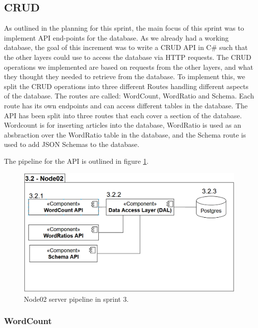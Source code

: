 \subsection{CRUD}

As outlined in the planning for this sprint, the main focus of this sprint was to implement API end-points for the database.
As we already had a working database, the goal of this increment was to write a CRUD API in C\# such that the other layers could use to access the database via HTTP requests.
The CRUD operations we implemented are based on requests from the other layers, and what they thought they needed to retrieve from the database.
To implement this, we split the CRUD operations into three different Routes handling different aspects of the database. The routes are called: WordCount, WordRatio and Schema. Each route has its own endpoints and can access different tables in the database. The API has been split into three routes that each cover a section of the database. Wordcount is for inserting articles into the database, WordRatio is used as an absbraction over the WordRatio table in the database, and the Schema route is used to add JSON Schemas to the database.

The pipeline for the API is outlined in figure \ref{Node02Sprint3}.

\begin{figure}[h]
    \centering
    \includegraphics[width=\linewidth]{Images/Node02Sprint3.PNG}
    \caption{Node02 server pipeline in sprint 3.}
    \label{Node02Sprint3}
\end{figure}

\subsubsection{WordCount}

